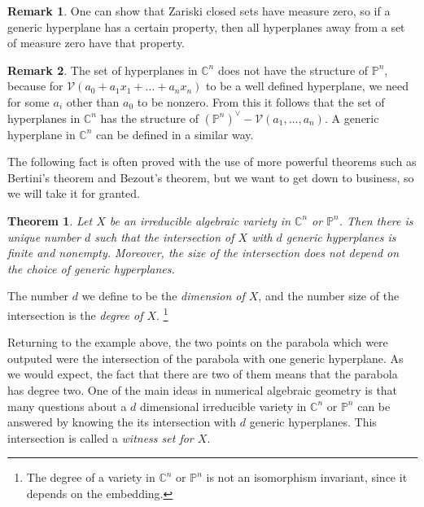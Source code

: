 \documentclass[12pt]{article}
\newtheorem{theorem}{Theorem}[section]
\theoremstyle{definition}
\newtheorem{remark}{Remark}[section]
\newcommand{\C}{\mathbb{C}}
\newcommand{\PP}{\mathbb{P}}
\begin{document}
\begin{remark}
   One can show that Zariski closed sets have measure zero, so if a 
   generic hyperplane has a certain property, then all hyperplanes away 
   from a set of measure zero have that property.
\end{remark}
\begin{remark}
   The set of hyperplanes in $\C^n$ does not have the structure of 
   $\PP^n$, because for $\mathcal{V}(a_0 + a_1x_1 + \ldots + a_nx_n)$ to 
   be a well defined hyperplane, we need for some $a_i$ other than $a_0$ 
   to be nonzero. From this it follows that the set of hyperplanes in 
   $\C^n$ has the structure of $(\PP^n)^\vee - \mathcal{V}(a_1, \ldots, 
   a_n)$. A generic hyperplane in $\C^n$ can be defined in a similar 
   way.
\end{remark}

The following fact is often proved with the use of more powerful 
theorems such as Bertini's theorem and Bezout's theorem, but we want to 
get down to business, so we will take it for granted.

\begin{theorem}
   Let $X$ be an irreducible algebraic variety in $\C^n$ or $\PP^n$. 
   Then there is unique number $d$ such that the intersection of $X$ 
   with $d$ generic hyperplanes is finite and nonempty. Moreover, the 
   size of the intersection does not depend on the choice of generic 
   hyperplanes.
\end{theorem}

The number $d$ we define to be the \emph{dimension of $X$}, and the number size 
of the intersection is the \emph{degree of $X$}. \footnote{The degree of 
a variety in $\C^n$ or $\PP^n$ is not an isomorphism invariant, since it 
depends on the embedding.}

Returning to the example above, the two points on the parabola which 
were outputed were the intersection of the parabola with one generic 
hyperplane. As we would expect, the fact that there are two of them 
means that the parabola has degree two. One of the main ideas 
in numerical algebraic geometry is that many questions about a $d$ 
dimensional irreducible variety in $\C^n$ or $\PP^n$ can be answered by knowing the 
its intersection with $d$ generic hyperplanes. This intersection is 
called a \emph{witness set for $X$}. 

\end{document}
